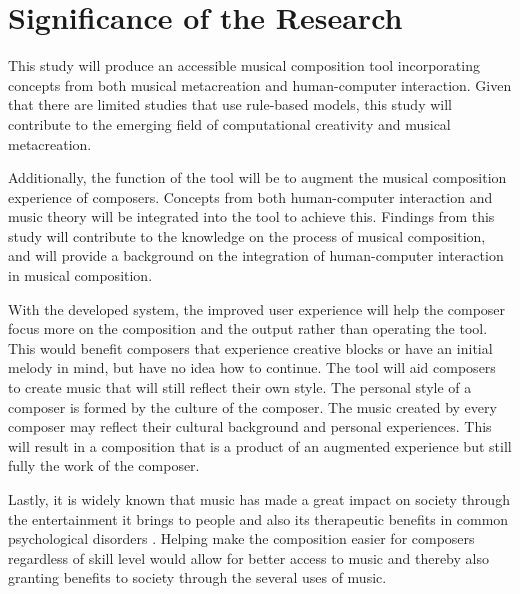 \section{Significance of the Research}
\label{sec:significance}

This study will produce an accessible musical composition tool incorporating concepts from both musical metacreation and human-computer interaction. Given that there are limited studies that use rule-based models, this study will contribute to the emerging field of computational creativity and musical metacreation.

Additionally, the function of the tool will be to augment the musical composition experience of composers. Concepts from both human-computer interaction and music theory will be integrated into the tool to achieve this. Findings from this study will contribute to the knowledge on the process of musical composition, and will provide a background on the integration of human-computer interaction in musical composition.

With the developed system, the improved user experience will help the composer focus more on the composition and the output rather than operating the tool. This would benefit composers that experience creative blocks or have an initial melody in mind, but have no idea how to continue. The tool will aid composers to create music that will still reflect their own style. The personal style of a composer is formed by the culture of the composer. The music created by every composer may reflect their cultural background and personal experiences. This will result in a composition that is a product of an augmented experience but still fully the work of the composer.

Lastly, it is widely known that music has made a great impact on society through the entertainment it brings to people \citep{hawkins2013pac, donnelly2005spectre} and also its therapeutic benefits in common psychological disorders \citep{kemper2005music}. Helping make the composition easier for composers regardless of skill level would allow for better access to music and thereby also granting benefits to society through the several uses of music.


